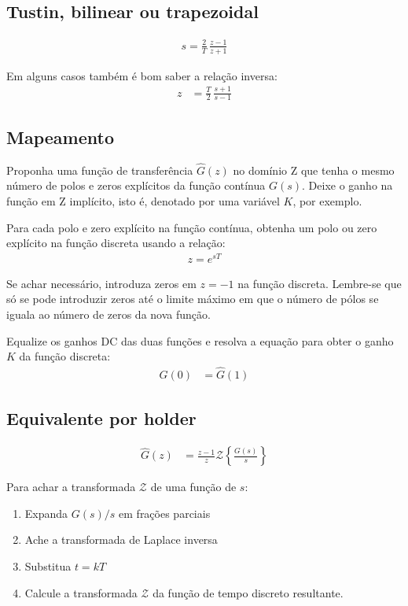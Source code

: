 \documentclass[12pt, a4paper]{article}
\begin{document}
\subsection{Tustin, bilinear ou trapezoidal}

\begin{align}
	s = \frac{2}{T}\,\frac{z-1}{z+1}
\end{align}

Em alguns casos também é bom saber a relação inversa:
\begin{align}
	z &= \frac{T}{2} \,\frac{s+1}{s-1}
\end{align}

\subsection{Mapeamento}

Proponha uma função de transferência $\hat{G}(z)$ no domínio Z que tenha o mesmo número de polos e zeros explícitos da função contínua $G(s)$. Deixe o ganho na função em Z implícito, isto é, denotado por uma variável $K$, por exemplo.

Para cada polo e zero explícito na função contínua, obtenha um polo ou zero explícito na função discreta usando a relação:
\begin{align}
	z = e^{sT}
\end{align}

Se achar necessário, introduza zeros em $z=-1$ na função discreta. Lembre-se que só se pode introduzir zeros até o limite máximo em que o número de pólos se iguala ao número de zeros da nova função. 

Equalize os ganhos DC das duas funções e resolva a equação para obter o ganho $K$ da função discreta:
\begin{align}
	G(0) &= \hat{G}(1)
\end{align}

\subsection{Equivalente por holder}

\begin{align}
	\hat{G}(z) &= \frac{z-1}{z} \mathcal{Z}\left\{\frac{G(s)}{s}\right\}
\end{align}

Para achar a transformada $\mathcal{Z}$ de uma função de $s$:
\begin{enumerate}
	\item Expanda $G(s)/s$ em frações parciais
	\item Ache a transformada de Laplace inversa
	\item Substitua $t=kT$
	\item Calcule a transformada $\mathcal{Z}$ da função de tempo discreto resultante. 
\end{enumerate}
\end{document}
